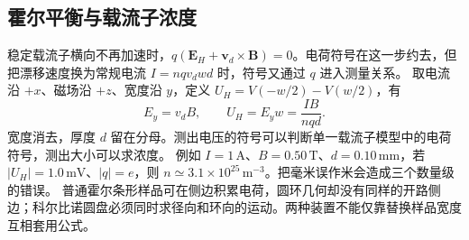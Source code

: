 \subsection{霍尔平衡与载流子浓度}
稳定载流子横向不再加速时，$q(\boldsymbol E_H+\boldsymbol v_d\times\boldsymbol B)=0$。电荷符号在这一步约去，但把漂移速度换为常规电流 $I=nqv_dwd$ 时，符号又通过 $q$ 进入测量关系。
取电流沿 $+x$、磁场沿 $+z$、宽度沿 $y$，定义 $U_H=V(-w/2)-V(w/2)$，有
\[
 E_y=v_dB,\qquad U_H=E_yw=\frac{IB}{nqd}.
\]
宽度消去，厚度 $d$ 留在分母。测出电压的符号可以判断单一载流子模型中的电荷符号，测出大小可以求浓度。
例如 $I=1\,\mathrm A$、$B=0.50\,\mathrm T$、$d=0.10\,\mathrm{mm}$，若 $|U_H|=1.0\,\mathrm{mV}$、$|q|=e$，则 $n\simeq3.1\times10^{25}\,\mathrm{m^{-3}}$。把毫米误作米会造成三个数量级的错误。
普通霍尔条形样品可在侧边积累电荷，圆环几何却没有同样的开路侧边；科尔比诺圆盘必须同时求径向和环向的运动。两种装置不能仅靠替换样品宽度互相套用公式。


